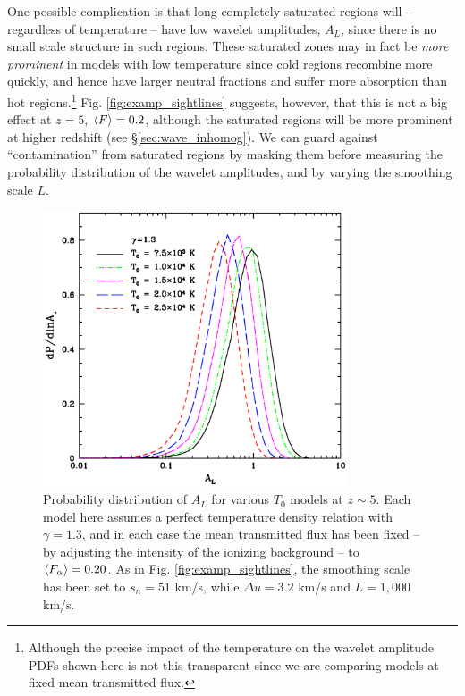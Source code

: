 One possible complication is that long completely saturated regions will -- regardless of temperature -- have low wavelet amplitudes, $A_L$, since there
is no small scale structure in such regions. These saturated zones may in fact be {\em more prominent} in models with
low temperature since cold regions recombine more quickly, and hence have larger neutral fractions and suffer more absorption 
than hot regions.\footnote{Although the precise impact of the temperature on the wavelet amplitude PDFs shown here is not this transparent since we are comparing models at fixed
mean transmitted flux.} Fig. \ref{fig:examp_sightlines} suggests, however, that this is not a big effect at $z=5$, $\langle F \rangle=0.2$, although the saturated regions will be more prominent at higher redshift (see \S \ref{sec:wave_inhomog}). We can
guard against ``contamination'' from saturated regions by masking them before measuring the probability distribution
of the wavelet amplitudes, and by varying the smoothing scale $L$.


\begin{figure}
\bc
\includegraphics[width=9cm]{f11.eps}
\caption{Probability distribution of $A_L$ for various $T_0$ models at $z \sim 5$. Each model here assumes a perfect temperature
density relation with $\gamma=1.3$, and in each case the mean transmitted flux
has been fixed -- by adjusting the intensity of the ionizing background -- to $\langle F_\alpha \rangle=0.20$. As in Fig. \ref{fig:examp_sightlines}, 
the smoothing scale has been set to $s_n=51$ km/s, while
$\Delta u = 3.2$ km/s and $L=1,000$ km/s.}
\label{fig:pdf_amp}
\ec
\end{figure}

